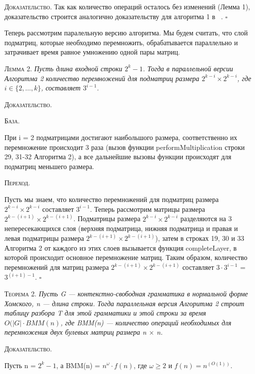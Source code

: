 \documentclass[14pt]{matmex-diploma}
\begin{document}
\textsc{Доказательство.}
Так как количество операций осталось без изменений (Лемма 1), доказательство строится аналогично доказательству для алгоритма 1 в ~\cite{okh}. $\square$

Теперь рассмотрим паралельную версию алгоритма. Мы будем считать, что слой подматриц, которые необходимо перемножить, обрабатывается параллельно и затрачивает время равное умножению одной пары матриц.

\textsc{Лемма 2.} 
\textit{Пусть длина входной строки $2^k - 1$. Тогда в параллельной версии Алгоритма 2 количество перемножений для подматриц размера $2^{k - i} \times 2^{k - i}$, где $i \in \{2, \ldots, k\}$, составляет $3^{i - 1}$.}

\textsc{Доказательство.}

\textsc{База.}

При i = 2 подматрицами достигают наибольшого размера, соответственно их перемножение происходит 3 раза (вызов функции \linebreak performMultiplication строки 29, 31-32 Алгоритма 2), а все дальнейшие вызовы функции происходят для подматриц меньшего размера.

\textsc{Переход.}

Пусть мы знаем, что количество перемножений для подматриц размера $2^{k - i} \times 2^{k - i}$ составляет $3^{i - 1}$. Теперь рассмотрим матрицы размера $2^{k - (i + 1)} \times 2^{k - (i + 1)}$. Подматрицы размера $2^{k - i} \times 2^{k - i}$ разделяются на 3 непересекающихся слоя (верхняя подматрица, нижняя подматрица и правая и левая подматрицы размера $2^{k - (i + 1)} \times 2^{k - (i + 1)}$), затем в строках 19, 30  и 33 Алгоритма 2 от каждого из этих слоев вызывается функция completeLayer, в которой происходит основное перемножение матриц. Таким образом, количество перемножений для матриц размера $2^{k - (i + 1)} \times 2^{k - (i + 1)}$ составляет $3 \cdot 3^{i - 1}$ = $3^{(i + 1) - 1}$. $\square$

\textsc{Теорема 2.} 
\textit{Пусть G --- контекстно-свободная грамматика в нормальной форме Хомского, n --- длина строки. Тогда параллельная версия Алгоритма 2 строит таблицу разбора T для этой грамматики и этой строки за время $O(|G|\cdot BMM(n)$, где BMM(n) --- количество операций необходимых для перемножения двух булевых матриц размера n $\times$ n.}

\textsc{Доказательство.}

Пусть n = $2^k - 1$, а BMM(n) = $n^\omega \cdot f(n)$, где $\omega \geq 2$ и $f(n) = n^(O(1))$.
\end{document}
